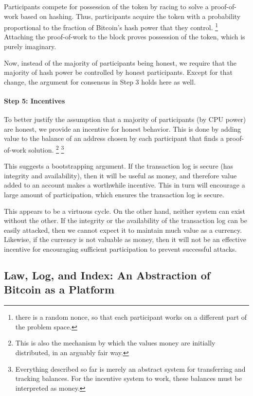 Participants compete for possession of the token by racing to solve a proof-of-work based on hashing. Thus, participants acquire the token with a probability proportional to the fraction of Bitcoin’s hash power that they control. \footnote{there is a random nonce, so that each participant works on a different part of the problem space.} Attaching the proof-of-work to the block proves possession of the token, which is purely imaginary.

Now, instead of the majority of participants being honest, we require that the majority of hash power be controlled by honest participants. Except for that change, the argument for consensus in Step 3 holds here as well.

\paragraph{Step 5: Incentives}

To better justify the assumption that a majority of participants (by CPU power) are honest, we provide an incentive for honest behavior. This is done by adding value to the balance of an address chosen by each participant that finds a proof-of-work solution. \footnote{This is also the mechanism by which the values money are initially distributed, in an arguably fair way.} \footnote{Everything described so far is merely an abstract system for transferring and tracking balances. For the incentive system to work, these balances must be interpreted as money.}

This suggests a bootstrapping argument. If the transaction log is secure (has integrity and availability), then it will be useful as money, and therefore value added to an account makes a worthwhile incentive. This in turn will encourage a large amount of participation, which ensures the transaction log is secure.

This appears to be a virtuous cycle. On the other hand, neither system can exist without the other. If the integrity or the availability of the transaction log can be easily attacked, then we cannot expect it to maintain much value as a currency. Likewise, if the currency is not valuable as money, then it will not be an effective incentive for encouraging sufficient participation to prevent successful attacks.


\subsection{Law, Log, and Index: An Abstraction of Bitcoin as a Platform}

